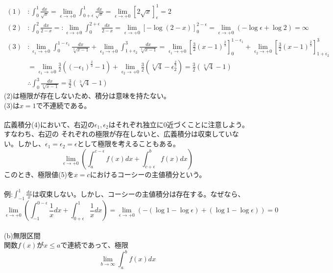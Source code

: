 \documentclass[a4j,dvipdfmx]{jsarticle}
\begin{document}
\begin{align*}
    (1)&:\int_0^1\frac{dx}{\sqrt{x}}=\lim_{\epsilon\to+0}\int_{0+\epsilon}^1\frac{dx}{\sqrt{x}}
    =\lim_{\epsilon\to+0}[2\sqrt{x}]_{\epsilon}^1=2\\
    (2)&:\int_0^2\frac{dx}{2-x}=:\lim_{\epsilon\to+0}\int_0^{2+\epsilon}\frac{dx}{2-x}
    =\lim_{\epsilon\to+0}[-\log(2-x)]_0^{2-\epsilon}=\lim_{\epsilon\to+0}(-\log\epsilon +\log 2)=\infty\\
    (3)&: \lim_{\epsilon_1\to+0}\int_0^{1-\epsilon_1}\frac{dx}{\sqrt[3]{x-1}}+\lim_{\epsilon_2\to+0}\int_{1+\epsilon_2}^3\frac{dx}{\sqrt[3]{x-1}}
    =\lim_{\epsilon_1\to+0}[\frac{3}{2}(x-1)^{\frac{2}{3}}]_0^{1-\epsilon_1}+\lim_{\epsilon_2\to+0}[\frac{3}{2}(x-1)^{\frac{2}{3}}]_{1+\epsilon_2}^3 \\
    &=\lim_{\epsilon_1\to+0}\frac{3}{2}((-\epsilon_1)^{\frac{2}{3}}-1)+\lim_{\epsilon_2\to+0}\frac{3}{2}(\sqrt[3]{4}-\epsilon_2^{\frac{2}{3}})=\frac{3}{2}(\sqrt[3]{4}-1)\\
    &\therefore \int_0^3\frac{dx}{\sqrt[3]{x-1}} =\frac{3}{2}(\sqrt[3]{4}-1)
\end{align*}
(2)は極限が存在しないため、積分は意味を持たない。\\
(3)は$x=1$で不連続である。\\\\
広義積分(4)において、右辺の$\epsilon_1,\epsilon_2$はそれぞれ独立に0近づくことに注意しよう。すなわち、右辺の
それぞれの極限が存在しないと、広義積分は収束していない。しかし、$\epsilon_1=\epsilon_2=\epsilon$として極限を考えることもある。
\begin{equation}
    \lim_{\epsilon\to+0}(\int_a^{c-\epsilon}f(x)dx +\int_{c+\epsilon}^bf(x)dx) 
\end{equation}
このとき、極限値(5)を$x=c$におけるコーシーの主値積分という。\\\\
例:$\int_{-1}^1 \frac{dx}{x}$は収束しない。しかし、コーシーの主値積分は存在する。なぜなら、\\
\begin{equation*}
    \lim_{\epsilon\to+0}(\int_{-1}^{0-\epsilon}\frac{1}{x}dx +\int_{0+\epsilon}^1\frac{1}{x}dx)
    =\lim_{\epsilon\to+0}(-(\log1-\log\epsilon)+(\log1-\log\epsilon))=0
\end{equation*}
\\
(b)無限区間\\
関数$f(x)$が$x\leq a$で連続であって、極限
\begin{equation}
    \lim_{b\to\infty}\int_a^bf(x)dx
\end{equation}
\end{document}
